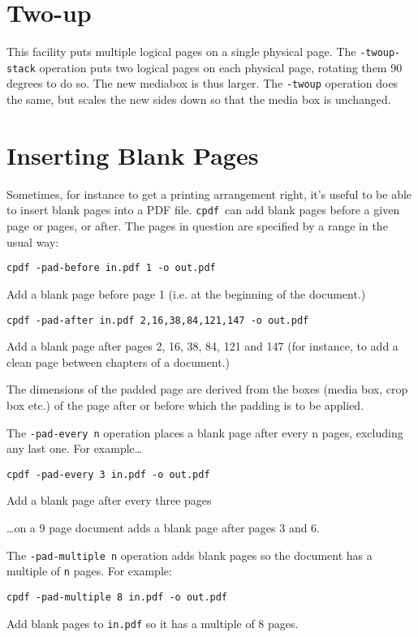 \documentclass{book}
\newcommand{\cpdf}{\texttt{cpdf}}
\begin{document}
  \section{Two-up}
    This facility puts multiple logical pages on a single physical page.  The \texttt{-twoup-stack} operation puts two logical pages on each physical
page, rotating them 90 degrees to do so. The new mediabox is thus larger. The \texttt{-twoup} operation does the same, but scales the new sides down so
that the media box is unchanged.

  \section{Inserting Blank Pages}
  Sometimes, for instance to get a printing arrangement right, it's useful to
be able to insert blank pages into a PDF file. \cpdf\ can add blank pages
before a given page or pages, or after. The pages in question are specified by
a range in the usual way:
  \begin{framed}
    \small\verb!cpdf -pad-before in.pdf 1 -o out.pdf!
 
    \vspace{2.5mm}
    \noindent Add a blank page before page 1 (i.e. at the beginning of the document.)

    \vspace{2.5mm}
    \verb!cpdf -pad-after in.pdf 2,16,38,84,121,147 -o out.pdf!

    \vspace{2.5mm}
    \noindent Add a blank page after pages 2, 16, 38, 84, 121 and 147 (for
instance, to add a clean page between chapters of a document.)
  \end{framed}
  \noindent The dimensions of the padded page are derived from the boxes (media box, crop box etc.) of the page after or before which the padding is to be applied.

  The \verb!-pad-every n! operation places a blank page after every n pages, excluding any last one. For example\ldots
  \begin{framed}
    \small\verb!cpdf -pad-every 3 in.pdf -o out.pdf!
 
    \vspace{2.5mm}
    \noindent Add a blank page after every three pages
  \end{framed}
  \noindent\ldots on a 9 page document adds a blank page after pages 3 and 6.

  The \verb!-pad-multiple n! operation adds blank pages so the document has a multiple of \verb!n! pages. For example:
  \begin{framed}
    \small\verb!cpdf -pad-multiple 8 in.pdf -o out.pdf!
 
    \vspace{2.5mm}
    \noindent Add blank pages to \texttt{in.pdf} so it has a multiple of 8 pages. 
  \end{framed}
 
\end{document}
